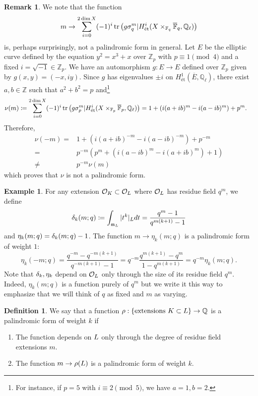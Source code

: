 \documentclass[10pt]{article}
\theoremstyle{plain}
\theoremstyle{definition}
\newtheorem{definition}[theorem]{Definition}
\newtheorem{example}[theorem]{Example}
\newtheorem{remark}[theorem]{Remark}
\numberwithin{equation}{section}
\begin{document}
\begin{remark}\label{rmk: individual densities are not palindromic}
We note that the function
\[m \to \sum_{i=0}^{2\dim X}(-1)^i\operatorname{tr}\left(g\sigma_q^m|H^i_{\text{\'et}}(X\times_{\mathbb F_q}\overline{\mathbb F}_q,\mathbb Q_\ell)\right)\]
is, perhaps surprisingly, not a palindromic form in general. Let $E$ be the elliptic curve defined by the equation $y^2 = x^3 + x$ over $\mathbb Z_p$ with $p \equiv 1 \pmod{4}$ and a fixed  $i = \sqrt{-1} \in \mathbb Z_p$. We have an automorphism $g: E \to E$ defined over $\mathbb Z_p$ given by $g(x,y) = (-x,iy)$. Since $g$ has eigenvalues $\pm i$ on $H^1_{\text{\'et}}(\overline{E},\mathbb Q_\ell)$, there exist $a,b \in \mathbb Z$ such that $a^2 + b^2 = p$ and\footnote{For instance, if $p = 5$ with $i \equiv 2 \pmod{5}$, we have $a = 1, b = 2$.}
\begin{align*}
    \nu(m) \coloneqq \sum_{i=0}^{2\dim X}(-1)^i&\operatorname{tr}\left(g\sigma_p^m|H^i_{\text{\'et}}(X\times_{\mathbb F_p}\overline{\mathbb F}_p,\mathbb Q_\ell)\right) = 1 + (i(a+ib)^m -i(a-ib)^m) + p^m.
\end{align*}
Therefore,
\begin{align*}
\nu(-m) =& 1 + (i(a+ib)^{-m} -i(a-ib)^{-m}) + p^{-m}\\
= &p^{-m}\left(p^m + (i(a-ib)^{m} -i(a+ib)^{m}) + 1 \right) \\\neq& p^{-m}\nu(m)
\end{align*}
which proves that $\nu$ is not a palindromic form.
\end{remark}


\begin{example}\label{defn: rho, eta}
For any extension ${{\mathcal O}_{K}}\subset { {\mathcal O} _{L}}$ where ${{\mathcal O}_{L}}$ has residue field $q^m$, we define
\[\delta_k(m;q) \coloneqq \int_{\mathfrak m_{L}}|t^k|_{L} dt = \frac{q^m-1}{q^{m(k+1)}-1}\]
and $\eta_k(m;q) = \delta_k(m;q) - 1$. The function $m \to \eta_k(m;q)$ is a palindromic form of weight $1$:
\[\eta_k(-m;q) = \frac{q^{-m} - q^{-m(k+1)}}{q^{-m(k+1)}-1} = q^{-m}\frac{q^{m(k+1)}-q^m}{1-q^{m(k+1)}} = q^{-m}\eta_k(m;q).\]
Note that $\delta_k,\eta_k$ depend on ${{\mathcal O}_{L}}$ only through the size of its residue field $q^m$. Indeed, $\eta_k(m;q)$ is a function purely of $q^m$ but we write it this way to emphasize that we will think of $q$ as fixed and $m$ as varying.

\begin{definition}\label{defn: palindromic forms as a function of rings}
We say that a function $\rho: \{\text{extensions } K \subset {L}\} \to \mathbb Q$ is a palindromic form of weight $k$ if
\begin{enumerate}
    \item The function depends on ${L}$ only through the degree of residue field extensions $m$.
    \item The function $m \to \rho({L})$ is a palindromic form of weight $k$.
\end{enumerate}
\end{definition}
\end{example}
\end{document}
